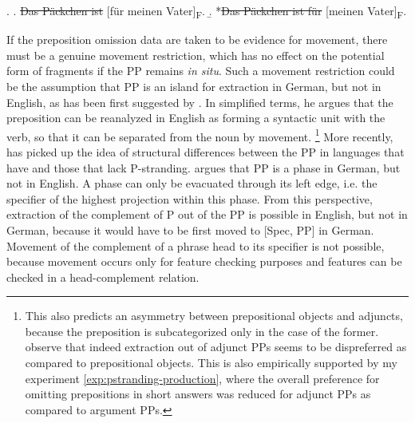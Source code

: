\ex. \label{ex:pst-focus-german}
\a. \sout{Das Päckchen ist} [für meinen Vater]\textsubscript{F}. 
\b. *\sout{Das Päckchen ist für} [meinen Vater]\textsubscript{F}.

If the preposition omission data are taken to be evidence for movement, there must be a genuine movement restriction, which has no effect on the potential form of fragments if the PP remains \textit{in situ}. Such a movement restriction could be the assumption that PP is an island for extraction in German, but not in English, as has been first suggested by \citet{vanriemsdijk1978}. In simplified terms, he argues that the preposition can be reanalyzed in English as forming a syntactic unit with the verb, so that it can be separated from the noun by movement.%
%
\footnote{This also predicts an asymmetry between prepositional objects and adjuncts, because the preposition is subcategorized only in the case of the former. \citet{pullum.huddleston2002} observe that indeed extraction out of adjunct PPs seems to be dispreferred as compared to prepositional objects. This is also empirically supported by my experiment \ref{exp:pstranding-production}, where the overall preference for omitting prepositions in short answers was reduced for adjunct PPs as compared to argument PPs.}\afterfn%
%
More recently, \citet{abels2003} has picked up the idea of structural differences between the PP in languages that have and those that lack P-stranding. \citeauthor{abels2003} argues that PP is a phase in German, but not in English. A phase can only be evacuated through its left edge, i.e. the specifier of the highest projection within this phase. From this perspective, extraction of the complement of P out of the PP is possible in English, but not in German, because it would have to be first moved to [Spec, PP] in German. Movement of the complement of a phrase head to its specifier is not possible, because movement occurs only for feature checking purposes and features can be checked in a head-complement relation.%
%

